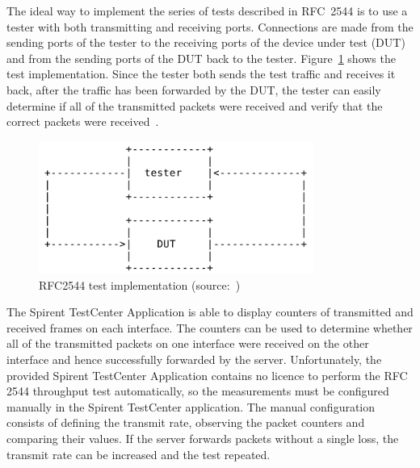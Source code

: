 The ideal way to implement the series of tests described in RFC~2544 is to use a tester
with both transmitting and receiving ports.
Connections are made from the sending ports of the tester to the receiving ports of the
device under test (DUT) and from the sending ports of the DUT back to the tester.
Figure~\ref{fig:analysis-rfc2544} shows the test implementation.   
Since the tester both sends the test traffic and receives
it back, after the traffic has been forwarded by the DUT, the tester
can easily determine if all of the transmitted packets were received
and verify that the correct packets were received~\cite{rfc2544}.
\begin{figure}
	\centering
	\includegraphics[width=9cm,keepaspectratio]{fig/rfc2544.png}
	\caption{RFC2544 test implementation (source:~\cite{rfc2544})}
	\label{fig:analysis-rfc2544}
\end{figure}

The Spirent TestCenter Application is able to display counters of transmitted and received frames on each interface.
The counters can be used to determine whether all of the transmitted packets on one interface were received
on the other interface and hence successfully forwarded by the server.
Unfortunately, the provided Spirent TestCenter Application contains no licence to perform the RFC 2544 throughput test
automatically, so the measurements must be configured manually in the Spirent TestCenter application.
The manual configuration consists of defining the transmit rate, observing the packet counters and comparing their values.
If the server forwards packets without a single loss, the transmit rate can be increased and the test repeated.
